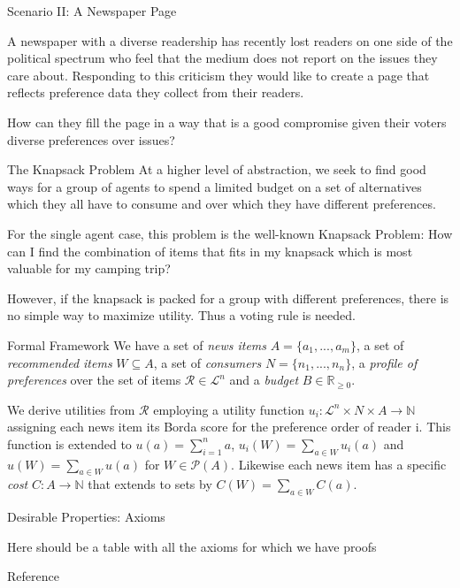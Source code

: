 \documentclass{beamer}
\begin{document}
\begin{frame}{Scenario II: A  Newspaper Page}

A newspaper with a diverse readership has recently lost readers on one side of the political spectrum who feel that the medium does not report on the issues they care about. Responding to this criticism they would like to create a page that reflects preference data they collect from their readers.

How can they fill the page in a way that is a good compromise given their voters diverse preferences over issues?
		
\end{frame}

\begin{frame}{The Knapsack Problem}
At a higher level of abstraction, we seek to find good ways for a group of agents to spend a limited budget on a set of alternatives which they all have to consume and over which they have different preferences. 	

For the single agent case, this problem is the well-known Knapsack Problem: How can I find the combination of items that fits in my knapsack which is most valuable for my camping trip?

However, if the knapsack is packed for a group with different preferences, there is no simple way to maximize utility. Thus a voting rule is needed.

\end{frame}

\begin{frame}{Formal Framework}
We have a set of \emph {news items} $A=\{a_1,...,a_m\}$, 
a set of \emph {recommended items} $W\subseteq A$, 
a set of \emph {consumers} $N=\{n_1,...,n_n\}$, 
a \emph {profile of preferences} over the set of items $\mathcal{R}\in \mathcal{L}^n$ 
and a \emph {budget} $B\in \mathbb{R}_{\geq 0}$. %

We derive utilities from $\mathcal{R}$ employing a utility function $u_i:\mathcal{L}^n \times N \times  A \rightarrow \mathbb{N}$ assigning each news item its Borda score for the preference order of reader i. This function is extended to $u(a)=\sum_{i=1}^n a$, $u_i(W)=\sum_{a\in W}u_i(a)$ and $u(W)=\sum_{a\in W}u(a)$ for $W\in \mathcal{P}(A)$. Likewise each news item has a specific \emph{cost} $C: A \rightarrow \mathbb {N}$ that extends to sets by $C(W)=\sum_{a\in W}C(a)$.

\end{frame}

\begin{frame}{Desirable Properties: Axioms}

Here should be a table with all the axioms for which we have proofs



\begin{block}{Reference}
\end{block}

\end{frame}
\end{document}
